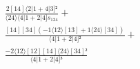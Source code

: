 \documentclass[varwidth, border=5pt]{standalone}
\begin{document}
\begin{my}
$\begin{gathered}
\scriptscriptstyle\frac{2[14]⟨2|1+4|3]²}{⟨24⟩⟨4|1+2|4]s_{124}} +\\
\scriptscriptstyle\frac{[14][34](-1⟨12⟩[13]+1⟨24⟩[34])}{⟨4|1+2|4]²} +\\
\scriptscriptstyle\frac{-2⟨12⟩[12][14]⟨24⟩[34]²}{⟨4|1+2|4]³} \phantom{+}
\end{gathered}$
\end{my}
\end{document}
